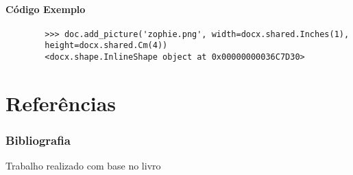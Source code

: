 \documentclass[12pt,a4paper,article]{report}
\begin{document}
\subsubsection{Código Exemplo}
    \begin{verbatim}
        >>> doc.add_picture('zophie.png', width=docx.shared.Inches(1),
        height=docx.shared.Cm(4)) 
        <docx.shape.InlineShape object at 0x00000000036C7D30>
    \end{verbatim}
    
\chapter{Referências} \label{Bibliografia}

\subsection{Bibliografia}
    Trabalho realizado com base no livro \citet{sweigart2015automate}




\end{document}
